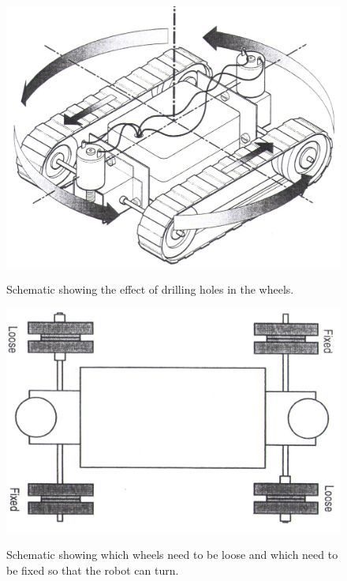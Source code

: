 \documentclass[]{report}   %
\begin{document}
						\begin{figure}[h]
							\caption{Schematic showing the effect of drilling holes in the wheels. \cite{roverschem}}
							\includegraphics[width=\textwidth, height=\textheight, keepaspectratio]{images/scem1}
							\label{fig:schem1}
						\end{figure}
						
						\begin{figure}[h]
							\caption{Schematic showing which wheels need to be loose and which need to be fixed so that the robot can turn.\cite{roverschem}}
							\includegraphics[width=\textwidth,height=\textheight,keepaspectratio]{images/scem2}
							\label{fig:schem2}
						\end{figure}
				
\end{document}
